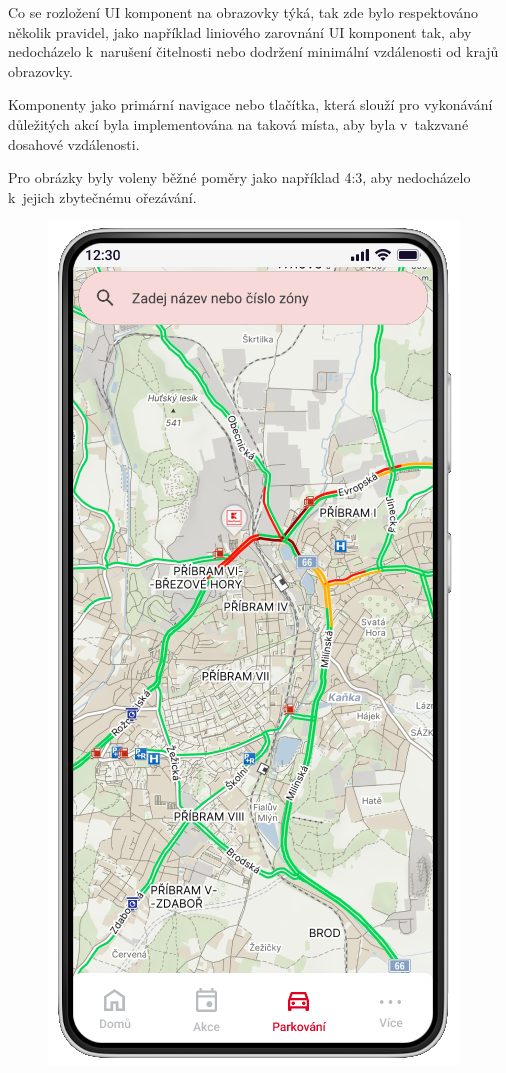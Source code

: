 \begin{minipage}[t]{0.45\textwidth}
  Co se rozložení UI komponent na obrazovky týká, tak zde bylo respektováno několik pravidel, jako například liniového zarovnání UI komponent tak,
   aby nedocházelo k~narušení čitelnosti nebo dodržení minimální vzdálenosti od krajů obrazovky.
  
  Komponenty jako primární navigace nebo tlačítka, která slouží pro vykonávání důležitých akcí byla implementována na taková místa, 
  aby byla v~takzvané dosahové vzdálenosti.
  
  Pro obrázky byly voleny běžné poměry jako například 4:3, aby nedocházelo k~jejich zbytečnému ořezávání.
\end{minipage}
\hfill
\begin{minipage}[t]{0.45\textwidth}
  \begin{figure}[H]
    \centering
    \includegraphics[width=.7\textwidth]{screen3.png}

\end{figure}
\end{minipage}

